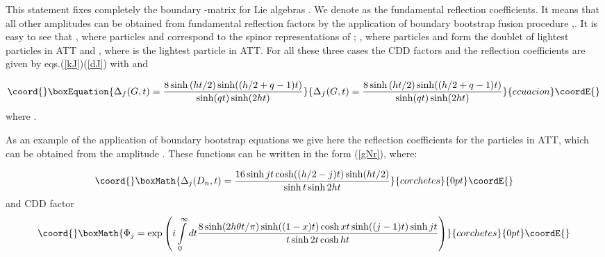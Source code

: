 \documentclass[a4paper,12pt]{article}
\begin{document}
This statement fixes completely the boundary \coordHE{}-matrix for Lie 
algebras \coordHE{}. We denote as \coordHE{} 
the fundamental reflection
coefficients. It means that all other amplitudes \coordHE{} 
can be obtained from fundamental reflection factors
\coordHE{} by the application 
of boundary bootstrap fusion procedure 
\cite{GZ},\cite{FK}. It is easy to see that 
\coordHE{}, 
where particles \coordHE{} and \coordHE{} correspond to the spinor
representations of \coordHE{}; \coordHE{}, 
where particles \coordHE{} and \coordHE{}
form the doublet of lightest particles in \coordHE{} ATT and \coordHE{}, where \coordHE{} is the lightest particle in \coordHE{} ATT. For all
these three cases the CDD factors \coordHE{} and the reflection
coefficients are given by eqs.(\ref{kJ})(\ref{dJ}) with \coordHE{} and

\begin{equation}\coord{}\boxEquation{
\Delta _f(G,t)=\frac{8\sinh \left( ht/2\right) \sinh ((h/2+q-1)t)}{\sinh
(qt)\sinh (2ht)}  \label{dE}
}{
\Delta _f(G,t)=\frac{8\sinh \left( ht/2\right) \sinh ((h/2+q-1)t)}{\sinh
(qt)\sinh (2ht)}  }{ecuacion}\coordE{}\end{equation}
where \coordHE{}.

As an example of the application of boundary bootstrap equations we give
here the reflection coefficients \coordHE{} for the particles 
\coordHE{} in \coordHE{} ATT, which can be obtained 
from the amplitude \coordHE{}. These functions can be written in
the form (\ref{gNr}), where:

\[\coord{}\boxMath{
\Delta _j(D_n,t)=\frac{16\sinh jt\cosh ((h/2-j)t)
\sinh (ht/2)}{\sinh t\sinh2ht}
}{corchetes}{0pt}\coordE{}\]
and CDD factor 
\[\coord{}\boxMath{
\Phi _j=\exp \left( i\int\limits_0^\infty dt\frac{8\sinh (2h\theta t/\pi )\sinh
((1-x)t)\cosh xt\sinh ((j-1)t)\sinh jt}{t\sinh 2t\cosh ht}\right) 
}{corchetes}{0pt}\coordE{}\]
\end{document}
